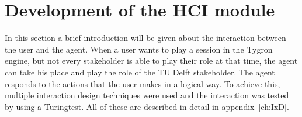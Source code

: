 \chapter{Development of the HCI module}
In this section a brief introduction will be given about the interaction between the user and the agent. When a user wants to play a session in the Tygron engine, but not every stakeholder is able to play their role at that time, the agent can take his place and play the role of the TU Delft stakeholder. The agent responds to the actions that the user makes in a logical way. To achieve this, multiple interaction design techniques were used and the interaction was tested by using a Turingtest. All of these are described in detail in appendix~\ref{ch:IxD}. 